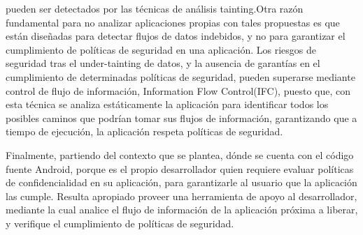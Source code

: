 pueden ser detectados por las técnicas de análisis tainting.\newline Otra razón
fundamental para no  analizar aplicaciones propias con tales propuestas es que
están diseñadas para detectar flujos de datos indebidos, y no para garantizar el
cumplimiento de políticas de seguridad en una aplicación.\newline 
Los riesgos de seguridad tras el under-tainting de datos, y la ausencia de
garantías en el cumplimiento de determinadas políticas de seguridad, pueden
superarse mediante control de flujo de información, Information Flow
Control(IFC), puesto que, con esta técnica se analiza estáticamente la
aplicación para identificar todos los posibles caminos que podrían tomar sus
flujos de información, garantizando que a tiempo de ejecución, la
aplicación respeta políticas de seguridad.\newline

Finalmente, partiendo del contexto que se plantea, dónde se cuenta con el código
fuente Android, porque es el propio desarrollador quien requiere evaluar
políticas de confidencialidad en su aplicación, para  garantizarle
al usuario que la aplicación las cumple. Resulta apropiado proveer una
herramienta de apoyo al desarrollador, mediante la cual analice el flujo de
información de la aplicación próxima a liberar, y verifique el cumplimiento de
políticas de seguridad.
 
















